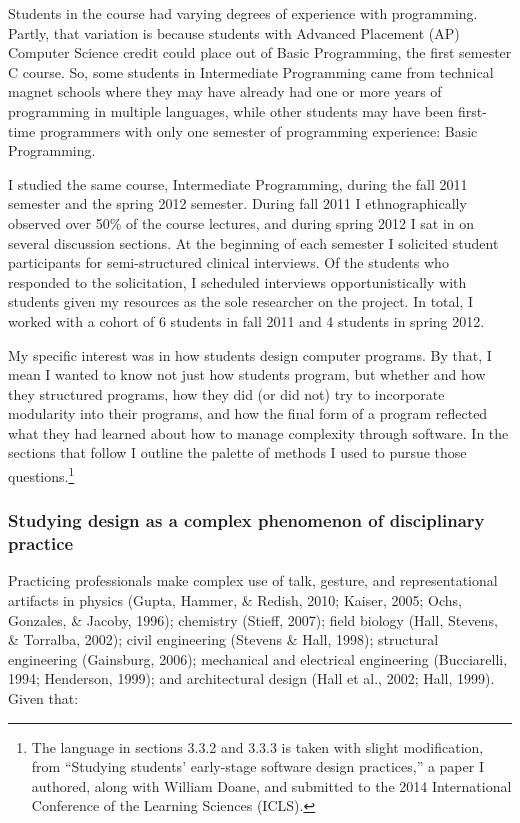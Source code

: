 Students in the course had varying degrees of experience with
programming. Partly, that variation is because students with Advanced
Placement (AP) Computer Science credit could place out of Basic
Programming, the first semester C course. So, some students in
Intermediate Programming came from technical magnet schools where they
may have already had one or more years of programming in multiple
languages, while other students may have been first-time programmers
with only one semester of programming experience: Basic Programming.

I studied the same course, Intermediate Programming, during the fall
2011 semester and the spring 2012 semester. During fall 2011 I
ethnographically observed over 50\% of the course lectures, and during
spring 2012 I sat in on several discussion sections. At the beginning of
each semester I solicited student participants for semi-structured
clinical interviews. Of the students who responded to the solicitation,
I scheduled interviews opportunistically with students given my
resources as the sole researcher on the project. In total, I worked with
a cohort of 6 students in fall 2011 and 4 students in spring 2012.

My specific interest was in how students design computer programs. By
that, I mean I wanted to know not just how students program, but whether
and how they structured programs, how they did (or did not) try to
incorporate modularity into their programs, and how the final form of a
program reflected what they had learned about how to manage complexity
through software. In the sections that follow I outline the palette of
methods I used to pursue those questions.\footnote{The language in
  sections 3.3.2 and 3.3.3 is taken with slight modification, from
  ``Studying students' early-stage software design practices,'' a paper
  I authored, along with William Doane, and submitted to the 2014
  International Conference of the Learning Sciences (ICLS).}

\subsubsection{Studying design as a complex phenomenon of disciplinary
practice}\label{studying-design-as-a-complex-phenomenon-of-disciplinary-practice}

Practicing professionals make complex use of talk, gesture, and
representational artifacts in physics (Gupta, Hammer, \& Redish, 2010;
Kaiser, 2005; Ochs, Gonzales, \& Jacoby, 1996); chemistry (Stieff,
2007); field biology (Hall, Stevens, \& Torralba, 2002); civil
engineering (Stevens \& Hall, 1998); structural engineering (Gainsburg,
2006); mechanical and electrical engineering (Bucciarelli, 1994;
Henderson, 1999); and architectural design (Hall et al., 2002; Hall,
1999). Given that:

